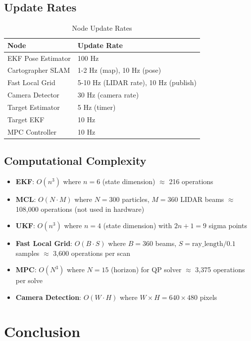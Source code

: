 \documentclass[11pt]{article}
\begin{document}
\subsection{Update Rates}

\begin{table}[H]
\centering
\caption{Node Update Rates}
\begin{tabular}{|l|l|}
\hline
\textbf{Node} & \textbf{Update Rate} \\
\hline
EKF Pose Estimator & 100 Hz \\
Cartographer SLAM & 1-2 Hz (map), 10 Hz (pose) \\
Fast Local Grid & 5-10 Hz (LIDAR rate), 10 Hz (publish) \\
Camera Detector & 30 Hz (camera rate) \\
Target Estimator & 5 Hz (timer) \\
Target EKF & 10 Hz \\
MPC Controller & 10 Hz \\
\hline
\end{tabular}
\end{table}

\subsection{Computational Complexity}

\begin{itemize}
    \item \textbf{EKF}: $O(n^3)$ where $n=6$ (state dimension) $\approx$ 216 operations
    \item \textbf{MCL}: $O(N \cdot M)$ where $N=300$ particles, $M=360$ LIDAR beams $\approx$ 108,000 operations (not used in hardware)
    \item \textbf{UKF}: $O(n^3)$ where $n=4$ (state dimension) with $2n+1=9$ sigma points
    \item \textbf{Fast Local Grid}: $O(B \cdot S)$ where $B=360$ beams, $S=\text{ray\_length}/0.1$ samples $\approx$ 3,600 operations per scan
    \item \textbf{MPC}: $O(N^3)$ where $N=15$ (horizon) for QP solver $\approx$ 3,375 operations per solve
    \item \textbf{Camera Detection}: $O(W \cdot H)$ where $W \times H = 640 \times 480$ pixels
\end{itemize}

\section{Conclusion}
\end{document}
